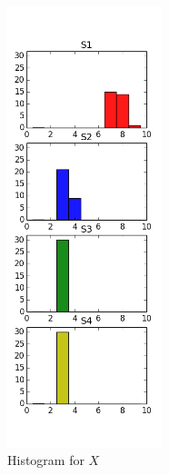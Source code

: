 \documentclass[12pt]{article}
\begin{document}
\begin{figure}[h]
	\centering
	\includegraphics[width=0.4\textwidth]{figure_1.png}
	\caption{Histogram for $X$}
	\label{fig:plot}
\end{figure}
\end{document}
